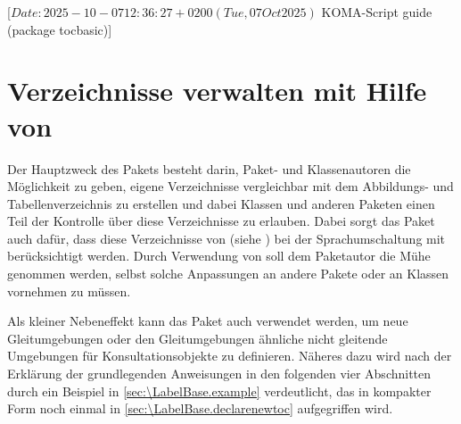 %
%
%
%
%
%
%

                 [$Date: 2025-10-07 12:36:27 +0200 (Tue, 07 Oct 2025) $
                  KOMA-Script guide (package tocbasic)]

\chapter{Verzeichnisse verwalten mit Hilfe von }

\BeginIndexGroup
{}%
%
%
Der Hauptzweck des Pakets  besteht darin, Paket- und
Klassenautoren die Möglichkeit zu geben, eigene Verzeichnisse vergleichbar mit
dem Abbildungs- und Tabellenverzeichnis zu erstellen und dabei Klassen und
anderen Paketen einen Teil der Kontrolle über diese Verzeichnisse zu
erlauben. Dabei sorgt das Paket  auch dafür, dass diese
Verzeichnisse von  (siehe
\cite{package:babel}) bei der Sprachumschaltung mit berücksichtigt
werden. Durch Verwendung von  soll dem Paketautor die Mühe
genommen werden, selbst solche Anpassungen an andere Pakete oder an Klassen
vornehmen zu müssen.

Als kleiner Nebeneffekt kann das Paket auch verwendet werden, um neue
Gleitumgebungen oder den Gleitumgebungen ähnliche nicht gleitende Umgebungen
für Konsultationsobjekte zu definieren. Näheres dazu wird nach der Erklärung
der grundlegenden Anweisungen in den folgenden vier Abschnitten durch ein
Beispiel in \autoref{sec:\LabelBase.example} verdeutlicht, das in kompakter Form
noch einmal in \autoref{sec:\LabelBase.declarenewtoc} aufgegriffen wird.

